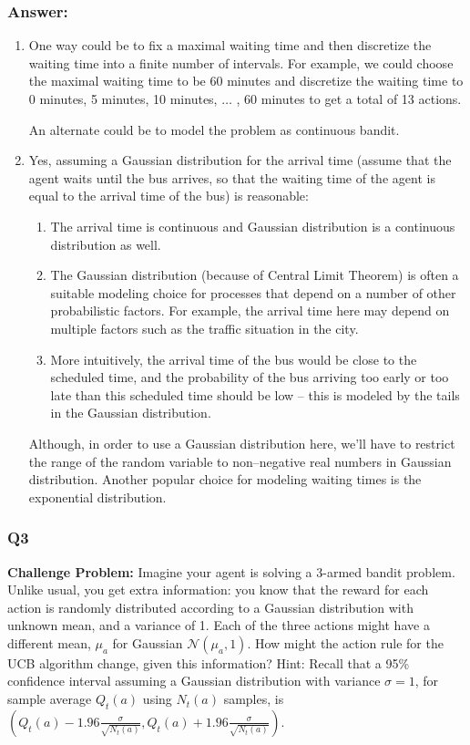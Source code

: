 \documentclass[a4paper, 10pt]{article}
\begin{document}
\subsubsection*{Answer:}
\begin{enumerate}
\item One way could be to fix a maximal waiting time and then discretize the waiting time into a finite number of intervals. For example, we could choose the maximal waiting time to be 60 minutes and discretize the waiting time to 0 minutes, 5 minutes, 10 minutes, $\ldots$ , 60 minutes to get a total of 13 actions.

  An alternate could be to model the problem as continuous bandit.
\item Yes, assuming a Gaussian distribution for the arrival time (assume that the agent waits until the bus arrives, so that the waiting time of the agent is equal to the arrival time of the bus) is reasonable:
  \begin{enumerate}
  \item The arrival time is continuous and Gaussian distribution is a continuous distribution as well.
  \item The Gaussian distribution (because of Central Limit Theorem) is often a suitable modeling choice for processes that depend on a number of other probabilistic factors. For example, the arrival time here may depend on multiple factors such as the traffic situation in the city.
  \item More intuitively, the arrival time of the bus would be close to the scheduled time, and the probability of the bus arriving too early or too late than this scheduled time should be low -- this is modeled by the tails in the Gaussian distribution.
  \end{enumerate}

  Although, in order to use a Gaussian distribution here, we'll have to restrict the range of the random variable to non--negative real numbers in Gaussian distribution. Another popular choice for modeling waiting times is the exponential distribution.
\end{enumerate}
  
\subsubsection*{Q3}
\textbf{Challenge Problem:} Imagine your agent is solving a 3-armed bandit problem. Unlike usual, you get extra information: you know that the reward for each action is randomly distributed according to a Gaussian distribution with unknown mean, and a variance of 1. Each of the three actions might have a different mean, $\mu_a$ for Gaussian $\mathcal{N}(\mu_{a}, 1)$. How might the action rule for the UCB algorithm change, given this information? Hint: Recall that a 95\% confidence interval assuming a Gaussian distribution with variance $\sigma = 1$, for sample average $Q_t(a)$ using $N_t(a)$ samples, is $(Q_t(a) - 1.96 \frac{\sigma}{\sqrt{N_t(a)}}, Q_t(a) + 1.96 \frac{\sigma}{\sqrt{N_t(a)}})$. 
\end{document}
